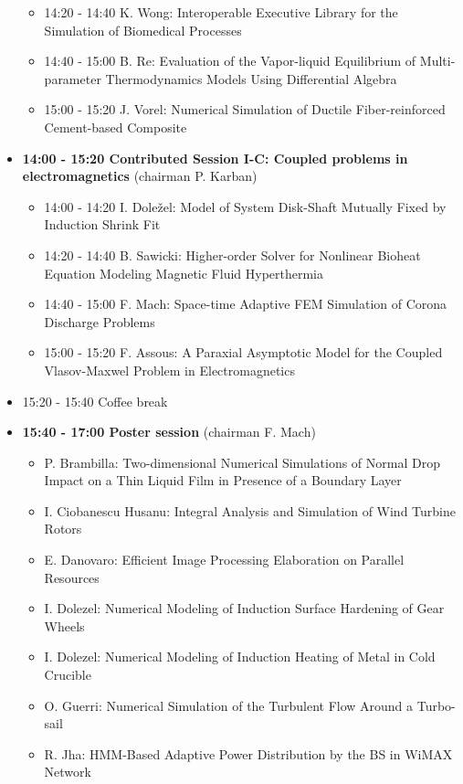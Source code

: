 \documentclass[10pt]{article}%
\begin{document}
\begin{itemize}
\begin{itemize}
    \item 14:20 - 14:40 {K. Wong}: {Interoperable Executive Library for the Simulation of Biomedical Processes}
    \item 14:40 - 15:00 {B. Re}: {Evaluation of the Vapor-liquid Equilibrium of Multi-parameter Thermodynamics Models Using Differential Algebra}
    \item 15:00 - 15:20 {J. Vorel}: {Numerical Simulation of Ductile Fiber-reinforced Cement-based Composite}
  \end{itemize}
    \item {\bf 14:00 - 15:20 Contributed Session I-C: Coupled problems in electromagnetics} (chairman P. Karban) 
  \begin{itemize}
    \item 14:00 - 14:20 {I. Doležel}: {Model of System Disk-Shaft Mutually Fixed by Induction Shrink Fit}
    \item 14:20 - 14:40 {B. Sawicki}: {Higher-order Solver for Nonlinear Bioheat Equation Modeling Magnetic Fluid Hyperthermia}
    \item 14:40 - 15:00 {F. Mach}: {Space-time Adaptive FEM Simulation of Corona Discharge Problems}
    \item 15:00 - 15:20 {F. Assous}: {A Paraxial Asymptotic Model for the Coupled Vlasov-Maxwel Problem in Electromagnetics}  %
    \end{itemize}
  \item 15:20 - 15:40 Coffee break
  \newpage
  \item {\bf 15:40 - 17:00 Poster session} (chairman F. Mach)
  \begin{itemize}
    \item P. Brambilla: {Two-dimensional Numerical Simulations of Normal Drop Impact on a Thin Liquid Film in Presence of a Boundary Layer}
    \item {I. Ciobanescu Husanu}: {Integral Analysis and Simulation of Wind Turbine Rotors}
    \item {E. Danovaro}: {Efficient Image Processing Elaboration on Parallel Resources}
    \item {I. Dolezel}: {Numerical Modeling of Induction Surface Hardening of Gear Wheels}
    \item {I. Dolezel}: {Numerical Modeling of Induction Heating of Metal in Cold Crucible}
    \item {O. Guerri}: {Numerical Simulation of the Turbulent Flow Around a Turbo-sail}
    \item {R. Jha}: {HMM-Based Adaptive Power Distribution by the BS in WiMAX Network}

\end{itemize}
\end{itemize}
\end{document}
